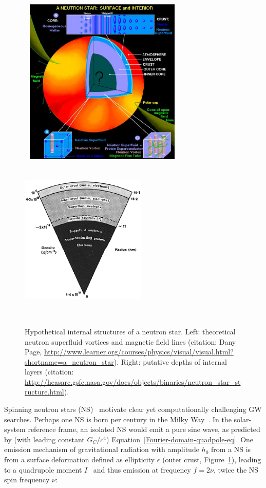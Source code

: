 	\begin{figure}
	\begin{center}
        \includegraphics[height=80mm, width=80mm]{plots/a_neutron_star.eps}
	\includegraphics[height=80mm, width=60mm]{neutron_star_structure.eps}
	\caption{Hypothetical internal structures of a neutron star.  Left: theoretical neutron superfluid vortices and magnetic field lines (citation: Dany Page, \url{http://www.learner.org/courses/physics/visual/visual.html?shortname=a_neutron_star}). Right: putative depths of internal layers (citation: \url{http://heasarc.gsfc.nasa.gov/docs/objects/binaries/neutron_star_structure.html}).} 
	\label{neutron_star_structure}
	\end{center}
	\end{figure}


Spinning neutron stars (NS)~\cite{Prix2006} motivate clear yet computationally challenging GW searches.
Perhaps one NS is born per century in the Milky Way~\cite{NarayanOstriker1990}.
In the solar-system reference frame, an isolated NS would emit a pure sine wave, as predicted by (with leading constant $G_C/c^4$) Equation~\ref{Fourier-domain-quadpole-eq}.
        One emission mechanism of gravitational radiation with amplitude $h_0$ from a NS is from a surface deformation defined as ellipticity $\epsilon$ (outer crust, Figure~\ref{neutron_star_structure}), leading to a quadrupole moment $I$~\cite{Zimmermann1979,LSCPulsar2006} and thus emission at frequency $f = 2\nu$, twice the NS spin frequency $\nu$:

